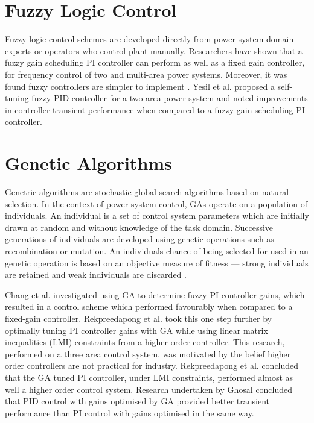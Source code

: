 \section{Fuzzy Logic Control}
Fuzzy logic control schemes are developed directly from power system domain experts or operators who control plant manually. Researchers have shown that a fuzzy gain scheduling PI controller can perform as well as a fixed gain controller, for frequency control of two and multi-area power systems. Moreover, it was found fuzzy controllers are simpler to implement \cite{Chang1997, Cam2005}. Yesil et al. \cite{Yesil2004} proposed a self-tuning fuzzy PID controller for a two area power system and noted improvements in controller transient performance when compared to a fuzzy gain scheduling PI controller.

\section{Genetic Algorithms}
Genetric algorithms are stochastic global search algorithms based on natural selection. In the context of power system control, GAs operate on a population of individuals. An individual is a set of control system parameters which are initially drawn at random and without knowledge of the task domain. Successive generations of individuals are developed using genetic operations such as recombination or mutation. An individuals chance of being selected for used in an genetic operation is based on an objective measure of fitness --- strong individuals are retained and weak individuals are discarded \cite{Fleming1993}.

Chang et al. \cite{Chang1998} investigated using GA to determine fuzzy PI controller gains, which resulted in a control scheme which performed favourably when compared to a fixed-gain controller. Rekpreedapong et al. \cite{Rerkpreedapong2003} took this one step further by optimally tuning PI controller gains with GA while using linear matrix inequalities (LMI) constraints from a higher order controller. This research, performed on a three area control system, was motivated by the belief higher order controllers are not practical for industry. Rekpreedapong et al. concluded that the GA tuned PI controller, under LMI constraints, performed almost as well a higher order control system. Research undertaken by Ghosal \cite{Ghoshal2004} concluded that PID control with gains optimised by GA provided better transient performance than PI control with gains optimised in the same way.

